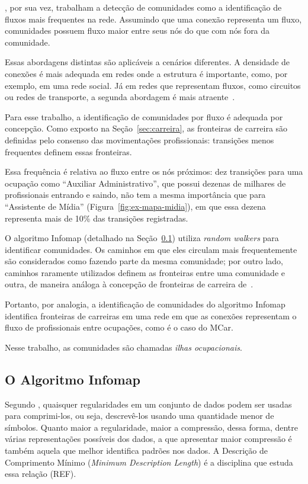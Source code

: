 \documentclass[
  article,
  11pt,
  a4paper,
  english,
  brazil,
  sumario=tradicional]{abntex2}
\begin{document}
, por sua vez, trabalham a detecção de comunidades como a identificação de fluxos mais frequentes na rede. Assumindo que uma conexão representa um fluxo, comunidades possuem fluxo maior entre seus nós do que com nós fora da comunidade.

Essas abordagens distintas são aplicáveis a cenários diferentes. A densidade de conexões é mais adequada em redes onde a estrutura é importante, como, por exemplo, em uma rede social. Já em redes que representam fluxos, como circuitos ou redes de transporte, a segunda abordagem é mais atraente~\cite{Rosvall2009-sd}.

Para esse trabalho, a identificação de comunidades por fluxo é adequada por concepção. Como exposto na Seção~\ref{sec:carreira}, as fronteiras de carreira são definidas pelo consenso das movimentações profissionais: transições menos frequentes definem essas fronteiras.

Essa frequência é relativa ao fluxo entre os nós próximos: dez transições para uma ocupação como \enquote{Auxiliar Administrativo}, que possui dezenas de milhares de profissionais entrando e saindo, não tem a mesma importância que para \enquote{Assistente de Mídia} (Figura~\ref{fig:ex-mapa-midia}), em que essa dezena representa mais de 10\% das transições registradas.

O algoritmo Infomap (detalhado na Seção~\ref{sec:infomap}) utiliza \textit{random walkers} para identificar comunidades. Os caminhos em que eles circulam mais frequentemente são considerados como fazendo parte da mesma comunidade; por outro lado, caminhos raramente utilizados definem as fronteiras entre uma comunidade e outra, de maneira análoga à concepção de fronteiras de carreira de~.

Portanto, por analogia, a identificação de comunidades do algoritmo Infomap identifica fronteiras de carreiras em uma rede em que as conexões representam o fluxo de profissionais entre ocupações, como é o caso do MCar.

Nesse trabalho, as comunidades são chamadas \textit{ilhas ocupacionais}.

\subsection{O Algoritmo Infomap} \label{sec:infomap}

Segundo , quaisquer regularidades em um conjunto de dados podem ser usadas para comprimi-los, ou seja, descrevê-los usando uma quantidade menor de símbolos. Quanto maior a regularidade, maior a compressão, dessa forma, dentre várias representações possíveis dos dados, a que apresentar maior compressão é também aquela que melhor identifica padrões nos dados. A Descrição de Comprimento Mínimo (\textit{Minimum Description Length}) é a disciplina que estuda essa relação (REF).
\end{document}
